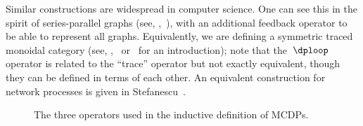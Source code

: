 Similar constructions are widespread in computer science. One can
see this in the spirit of series-parallel graphs (see, \eg ,~\cite{duffin65topology}),
with an additional feedback operator to be able to represent all graphs.
Equivalently, we are defining a symmetric traced monoidal category
(see, \eg ,~\cite{joyal96traced} or~\cite{spivak14category} for
an introduction); note that the~$\dploop$ operator is related to
the ``trace'' operator but not exactly equivalent, though they can
be defined in terms of each other. An equivalent construction for
network processes is given in Stefanescu~\cite{stefanescu00}.

\begin{figure}[h]
    \centering{}\hfill{}\hfill{}\hfill{}\smallskip{}
    \caption{\label{fig:series-par-loop}The three operators used in the inductive
    definition of MCDPs.}
\end{figure}

